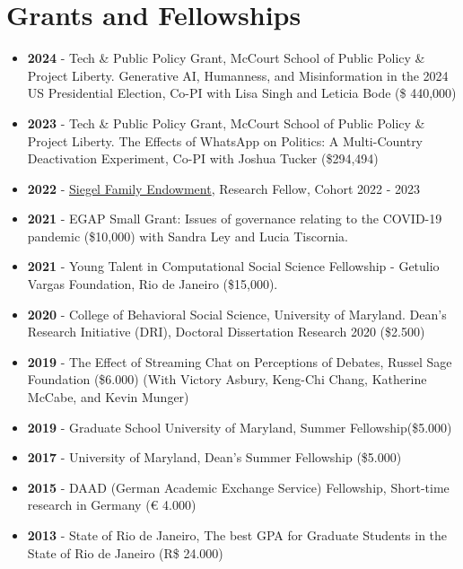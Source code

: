 \documentclass[letterpaper, 11pt]{article}
\begin{document}
\section*{Grants and Fellowships}
    \begin{itemize}[leftmargin=.45cm]
        \item \textbf{2024} - Tech \& Public Policy Grant, McCourt School of Public Policy \& Project Liberty. Generative AI, Humanness, and Misinformation in the 2024 US Presidential Election, Co-PI with Lisa Singh and Leticia Bode (\$ 440,000)
        \item \textbf{2023} - Tech \& Public Policy Grant, McCourt School of Public Policy \& Project Liberty. The Effects of WhatsApp on Politics: A Multi-Country Deactivation Experiment, Co-PI with Joshua Tucker (\$294,494)
         \item \textbf{2022} - \href{https://www.siegelendowment.org/}{Siegel Family Endowment}, Research Fellow, Cohort 2022 - 2023
        \item \textbf{2021} - EGAP Small Grant: Issues of governance relating to the COVID-19 pandemic (\$10,000) with Sandra Ley and Lucia Tiscornia.
        \item \textbf{2021} - Young Talent in Computational Social Science Fellowship - Getulio Vargas Foundation, Rio de Janeiro (\$15,000).
        \item \textbf{2020} - College of Behavioral Social Science, University of Maryland. Dean's Research Initiative (DRI), Doctoral Dissertation Research 2020 (\$2.500)
        \item \textbf{2019} - The Effect of Streaming Chat on Perceptions of Debates, Russel Sage Foundation (\$6.000) (With Victory Asbury, Keng-Chi Chang, Katherine McCabe, and Kevin Munger)
        \item \textbf{2019} - Graduate School University of Maryland, Summer Fellowship(\$5.000)
        \item \textbf{2017} - University of Maryland, Dean's Summer Fellowship (\$5.000)
        \item \textbf{2015} - DAAD (German Academic Exchange Service) Fellowship,  Short-time research in Germany (\euro{} 4.000)
        \item \textbf{2013} - State of Rio de Janeiro, The best GPA for Graduate Students in the State of Rio de Janeiro (R\$ 24.000)
    \end{itemize}
\end{document}
